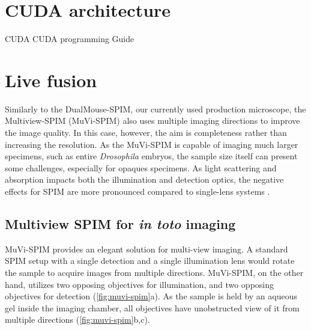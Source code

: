   \section{CUDA architecture}

    CUDA \cite{nickolls_scalable_2008}
    CUDA programming Guide \cite{nvidia_cuda_2015}




\section{Live fusion}

Similarly to the DualMouse-SPIM, our currently used production microscope, the Multiview-SPIM (MuVi-SPIM) \cite{krzic_multiview_2012} also uses multiple imaging directions to improve the image quality. In this case, however, the aim is completeness rather than increasing the resolution. As the MuVi-SPIM is capable of imaging much larger specimens, such as entire \textit{Drosophila} embryos, the sample size itself can present some challenges, especially for opaques specimens. As light scattering and absorption impacts both the illumination and detection optics, the negative effects for SPIM are more pronounced compared to single-lens systems \cite{de_medeiros_deep_2016}.




\subsection{Multiview SPIM for \textit{in toto} imaging}

MuVi-SPIM  provides an elegant solution for multi-view imaging. A standard SPIM setup with a single detection and a single illumination lens would rotate the sample to acquire images from multiple directions. MuVi-SPIM, on the other hand, utilizes two opposing objectives for illumination, and two opposing objectives for detection (\autoref{fig:muvi-spim}a). As the sample is held by an aqueous gel inside the imaging chamber, all objectives have unobstructed view of it from multiple directions (\autoref{fig:muvi-spim}b,c).

